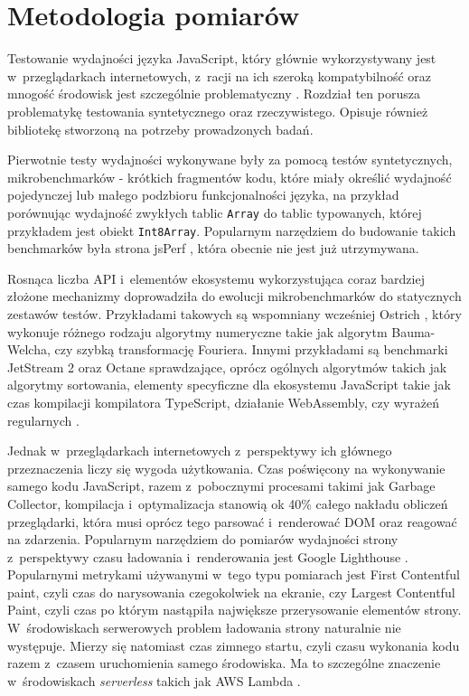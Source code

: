 \chapter{Metodologia pomiarów}

Testowanie wydajności języka JavaScript, który głównie wykorzystywany jest w~przeglądarkach internetowych, z~racji na ich szeroką kompatybilność oraz mnogość środowisk jest szczególnie problematyczny \cite{v8-real-perf}. Rozdział ten porusza problematykę testowania syntetycznego oraz rzeczywistego. Opisuje również bibliotekę stworzoną na potrzeby prowadzonych badań.

Pierwotnie testy wydajności wykonywane były za pomocą testów syntetycznych, mikrobenchmarków - krótkich fragmentów kodu, które miały określić wydajność pojedynczej lub małego podzbioru funkcjonalności języka, na przykład porównując wydajność zwykłych tablic \mbox{\lstinline{Array}} do tablic typowanych, której przykładem jest obiekt \lstinline{Int8Array}. Popularnym narzędziem do budowanie takich benchmarków była strona jsPerf \cite{jsperf}, która obecnie nie jest już utrzymywana.

Rosnąca liczba API i~elementów ekosystemu wykorzystująca coraz bardziej złożone mechanizmy doprowadziła do ewolucji mikrobenchmarków do statycznych zestawów testów. Przykładami takowych są wspomniany wcześniej Ostrich \cite{ostrich}, który wykonuje różnego rodzaju algorytmy numeryczne takie jak algorytm Bauma-Welcha, czy szybką transformację Fouriera. Innymi przykładami są benchmarki JetStream 2 oraz Octane sprawdzające, oprócz ogólnych algorytmów takich jak algorytmy sortowania, elementy specyficzne dla ekosystemu JavaScript takie jak czas kompilacji kompilatora TypeScript, działanie WebAssembly, czy wyrażeń regularnych \cite{octane, jetstream}.

Jednak w~przeglądarkach internetowych z~perspektywy ich głównego przeznaczenia liczy się wygoda użytkowania. Czas poświęcony na wykonywanie samego kodu JavaScript, razem z~pobocznymi procesami takimi jak Garbage Collector, kompilacja i~optymalizacja stanowią ok 40\% całego nakładu obliczeń przeglądarki, która musi oprócz tego parsować i~renderować DOM oraz reagować na zdarzenia. Popularnym narzędziem do pomiarów wydajności strony z~perspektywy czasu ładowania i~renderowania jest Google Lighthouse \cite{lighthouse}. Popularnymi metrykami używanymi w~tego typu pomiarach jest First Contentful paint, czyli czas do narysowania czegokolwiek na ekranie, czy Largest Contentful Paint, czyli czas po którym nastąpiła największe przerysowanie elementów strony. W~środowiskach serwerowych problem ładowania strony naturalnie nie występuje. Mierzy się natomiast czas zimnego startu, czyli czasu wykonania kodu razem z~czasem uruchomienia samego środowiska. Ma to szczególne znaczenie w~środowiskach \textit{serverless} takich jak AWS Lambda \cite{aws-lambda}.

